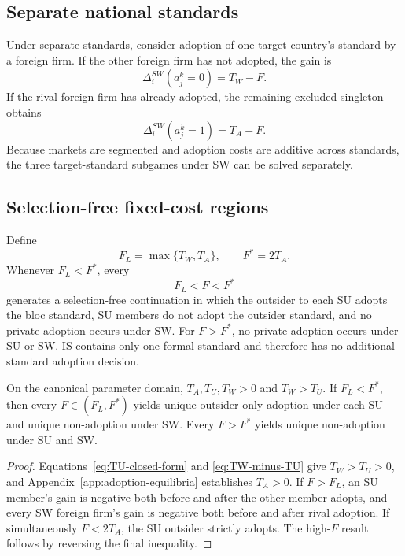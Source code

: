 \subsection{Separate national standards}
\label{subsec:private-sw}

Under separate standards, consider adoption of one target country's standard by a foreign firm. If the other foreign firm has not adopted, the gain is
\begin{equation}
    \Delta_i^{SW}(a_j^k=0)
    =T_W-F.
    \label{eq:sw-unilateral-gain}
\end{equation}
If the rival foreign firm has already adopted, the remaining excluded singleton obtains
\begin{equation}
    \Delta_i^{SW}(a_j^k=1)
    =T_A-F.
    \label{eq:sw-post-rival-gain}
\end{equation}
Because markets are segmented and adoption costs are additive across standards, the three target-standard subgames under SW can be solved separately.

\subsection{Selection-free fixed-cost regions}
\label{subsec:private-regions}

Define
\begin{equation}
    F_L=\max\{T_W,T_A\},
    \qquad
    F^*=2T_A.
    \label{eq:private-F-boundaries}
\end{equation}
Whenever $F_L<F^*$, every
\begin{equation}
    F_L<F<F^*
    \label{eq:intermediate-F-region}
\end{equation}
generates a selection-free continuation in which the outsider to each SU adopts the bloc standard, SU members do not adopt the outsider standard, and no private adoption occurs under SW. For $F>F^*$, no private adoption occurs under SU or SW. IS contains only one formal standard and therefore has no additional-standard adoption decision.

\begin{lemma}
\label{lem:private-adoption}
On the canonical parameter domain, $T_A,T_U,T_W>0$ and $T_W>T_U$. If $F_L<F^*$, then every $F\in(F_L,F^*)$ yields unique outsider-only adoption under each SU and unique non-adoption under SW. Every $F>F^*$ yields unique non-adoption under SU and SW.
\end{lemma}

\begin{proof}
Equations~\eqref{eq:TU-closed-form} and \eqref{eq:TW-minus-TU} give $T_W>T_U>0$, and Appendix~\ref{app:adoption-equilibria} establishes $T_A>0$. If $F>F_L$, an SU member's gain is negative both before and after the other member adopts, and every SW foreign firm's gain is negative both before and after rival adoption. If simultaneously $F<2T_A$, the SU outsider strictly adopts. The high-$F$ result follows by reversing the final inequality.
\end{proof}

